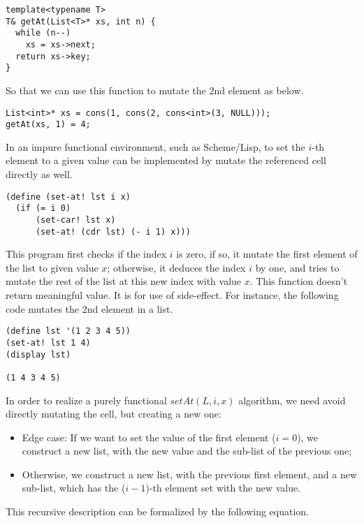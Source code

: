 \documentclass{article}
\begin{document}
\lstset{language=C++}
\begin{lstlisting}
template<typename T>
T& getAt(List<T>* xs, int n) {
  while (n--)
    xs = xs->next;
  return xs->key;
}
\end{lstlisting}

So that we can use this function to mutate the 2nd element as below.

\begin{lstlisting}
List<int>* xs = cons(1, cons(2, cons<int>(3, NULL)));
getAt(xs, 1) = 4;
\end{lstlisting}

In an impure functional environment, such as Scheme/Lisp, to set the $i$-th element to a given value can
be implemented by mutate the referenced cell directly as well.

\lstset{language=Lisp}
\begin{lstlisting}
(define (set-at! lst i x)
  (if (= i 0)
      (set-car! lst x)
      (set-at! (cdr lst) (- i 1) x)))
\end{lstlisting}

This program first checks if the index $i$ is zero, if so, it mutate the first element of the list to
given value $x$; otherwise, it deduces the index $i$ by one, and tries to mutate the rest of the 
list at this new index with value $x$. This function doesn't return meaningful value. It is for use
of side-effect. For instance, the following code mutates the 2nd element in a list.

\begin{lstlisting}
(define lst '(1 2 3 4 5))
(set-at! lst 1 4)
(display lst)

(1 4 3 4 5)
\end{lstlisting}

In order to realize a purely functional $setAt(L, i, x)$ algorithm, we need avoid directly mutating the cell,
but creating a new one:

\begin{itemize}
\item Edge case: If we want to set the value of the first element ($i = 0$), we construct a new list, with the
new value and the sub-list of the previous one;
\item Otherwise, we construct a new list, with the previous first element, and a new sub-list, which has the ($i-1$)-th
element set with the new value.
\end{itemize}

This recursive description can be formalized by the following equation.
\end{document}
